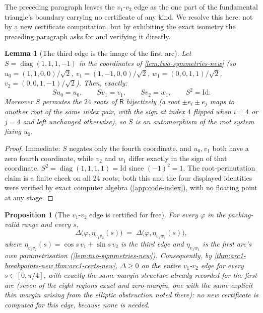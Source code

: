 \documentclass[11pt,reqno]{amsart}
\renewcommand{\_}{\origunderscore\allowbreak}
\numberwithin{equation}{section}
\theoremstyle{plain}
\newtheorem{prop}[thm]{Proposition}
\newtheorem{lem}[thm]{Lemma}
\theoremstyle{definition}
\theoremstyle{remark}
\newcommand{\Rt}{\mathsf{R}}                 %
\newcommand{\tilt}{\varphi}                  %
\newcommand{\arcp}{s}                        %
\newcommand{\dev}{\eta}                      %
\newcommand{\defect}{\Delta}                 %
\DeclareMathOperator{\diag}{diag}
\begin{document}
The preceding paragraph leaves the $v_1$-$v_2$ edge as the one part of
the fundamental triangle's boundary carrying no certificate of any
kind. We resolve this here: not by a new certificate computation, but
by exhibiting the exact isometry the preceding paragraph asks for and
verifying it directly.

\begin{lem}[The third edge is the image of the first arc]\label{lem:third-edge-symmetry}
Let $S=\diag(1,1,1,-1)$ in the coordinates of
\cref{lem:two-symmetries-new} (so $u_0=(1,1,0,0)/\sqrt2$,
$v_1=(1,-1,0,0)/\sqrt2$, $w_1=(0,0,1,1)/\sqrt2$,
$v_2=(0,0,1,-1)/\sqrt2$). Then, exactly:
\[
  S u_0=u_0,\qquad S v_1=v_1,\qquad S v_2=w_1,\qquad S^2=\mathrm{Id}.
\]
Moreover $S$ permutes the $24$ roots of $\Rt$ bijectively (a root
$\pm e_i\pm e_j$ maps to another root of the same index pair, with the
sign at index $4$ flipped when $i=4$ or $j=4$ and left unchanged
otherwise), so $S$ is an automorphism of the root system fixing $u_0$.
\end{lem}

\begin{proof}
Immediate: $S$ negates only the fourth coordinate, and $u_0,v_1$ both
have a zero fourth coordinate, while $v_2$ and $w_1$ differ exactly in
the sign of that coordinate. $S^2=\diag(1,1,1,1)=\mathrm{Id}$ since
$(-1)^2=1$. The root-permutation claim is a finite check on all $24$
roots; both this and the four displayed identities were verified by
exact computer algebra (\cref{app:code-index}), with no floating point
at any stage.
\end{proof}

\begin{prop}[The $v_1$-$v_2$ edge is certified for free]\label{prop:third-edge-cert}
For every $\tilt$ in the packing-valid range and every $\arcp$,
\[
  \defect\bigl(\tilt,\dev_{v_1v_2}(\arcp)\bigr) \;=\;
  \defect\bigl(\tilt,\dev_{v_1w_1}(\arcp)\bigr),
\]
where $\dev_{v_1v_2}(\arcp)=\cos\arcp\,v_1+\sin\arcp\,v_2$ is the third
edge and $\dev_{v_1w_1}$ is the first arc's own parametrisation
(\cref{lem:two-symmetries-new}). Consequently, by
\cref{thm:arc1-breakpoints-new,thm:arc1-certs-new}, $\defect\ge0$ on the
entire $v_1$-$v_2$ edge for every $\arcp\in[0,\pi/4]$, with exactly the
same margin structure already recorded for the first arc (seven of the
eight regions exact and zero-margin, one with the same explicit
thin margin arising from the elliptic obstruction noted there): no new
certificate is computed for this edge, because none is needed.
\end{prop}
\end{document}
